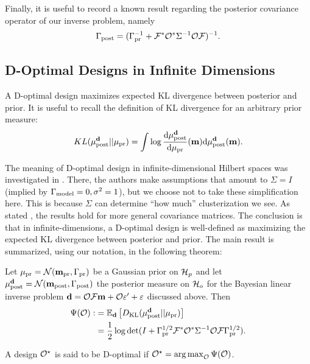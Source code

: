 \documentclass{amsart}
\numberwithin{equation}{section}
\begin{document}
Finally, it is useful to record a known result regarding the posterior
covariance operator of our inverse problem, namely
\begin{align}\label{eq:postcov}
  \Gamma_{\textup{post}} = (\Gamma_{\textup{pr}}^{-1} + \mathcal{F}^* \mathcal{O}^* \Sigma^{-1} \mathcal{O} \mathcal{F}
  )^{-1}.
\end{align}


\subsection{D-Optimal Designs in Infinite Dimensions}\label{subsec:D optimal design} 
A D-optimal design maximizes expected KL divergence between posterior
and prior. It is useful to recall the definition of KL divergence for
an arbitrary prior measure:
$$
KL(\mu_{\textup{post}}^{\mathbf{d}}||\mu_{\textup{pr}}) = \int \log \frac{\text{\textup{d}} \mu_{\textup{post}}^{\mathbf{d}}}{\text{\textup{d}} \mu_{\textup{pr}}}(\mathbf{m}) \text{\textup{d}} \mu_{\textup{post}}^{\mathbf{d}}(\mathbf{m}).
$$

The meaning of D-optimal design in infinite-dimensional Hilbert spaces
was investigated in \cite{AlexanderianGloorGhattas14}. There, the
authors make assumptions that amount to $\Sigma=I$ (implied by
$\Gamma_{\textup{model}} = 0,\sigma^2=1$), but we choose not to take these
simplification here. This is because $\Sigma$ can determine ``how
much'' clusterization we see. As stated
\cite[pp. 681]{AlexanderianGloorGhattas14}, the results hold for more
general covariance matrices. The conclusion is that in
infinite-dimensions, a D-optimal design is well-defined as maximizing
the expected KL divergence between posterior and prior. The main
result is summarized, using our notation, in the following theorem:
\begin{theorem}
  Let $\mu_{\textup{pr}} = \mathcal{N}(\mathbf{m}_{\textup{pr}},\Gamma_{\textup{pr}})$ be a Gaussian prior on $\mathcal{H}_p$
  and let $\mu_{\textup{post}}^{\mathbf{d}} = \mathcal{N}(\mathbf{m}_{\textup{post}},\Gamma_{\textup{post}})$ the posterior measure
  on $\mathcal{H}_o$ for the Bayesian linear inverse problem $\mathbf{d} = \mathcal{O}
  \mathcal{F}\mathbf{m} + \mathcal{O} \varepsilon' + \varepsilon$ discussed above. Then
  \begin{align}\label{eq:objective}
    \begin{split}
      \Psi( \mathcal{O}) :&= \mathbb{E}_{\mathbf{d}}\left [ D_{\text{KL}} (\mu_{\textup{post}}^{\mathbf{d}} || \mu_{\textup{pr}} ) \right ] \\
      &= \frac12 \log \det 
      ( I + \Gamma_{\textup{pr}}^{1/2}  \mathcal{F} ^* \mathcal{O}^* \Sigma^{-1} \mathcal{O} \mathcal{F} \Gamma_{\textup{pr}}^{1/2}).
    \end{split}
  \end{align}
\end{theorem}
\begin{definition}\label{def:d optimality}
  A design $\mathcal{O}^{\star}$ is said to be D-optimal if $\mathcal{O}^{\star} = \operatorname*{arg\,max}_{\mathcal{O}} \Psi(\mathcal{O})$.
\end{definition}
\end{document}
